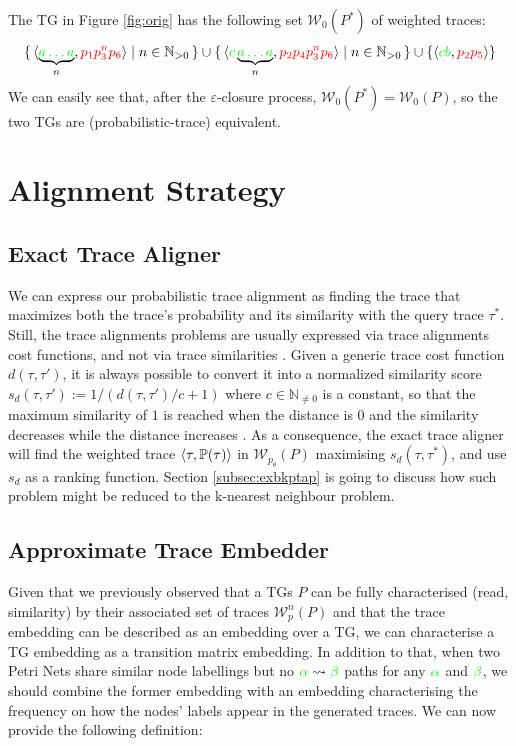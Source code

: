 \begin{example}
	The TG in Figure \ref{fig:orig} has the following set $\mathcal{W}_0(P^*)$ of weighted traces:
$$\set{\braket{\underbrace{\color{green}a\dots a}_{n},{\color{red}p_1p_3^np_6}}|n\in \mathbb{N}_{>0}}\cup \set{\braket{{\color{green}c}\underbrace{\color{green}a\dots a}_{n},{\color{red}p_2p_4p_3^np_6}}|n\in \mathbb{N}_{>0}}\cup\{\braket{{\color{green}cb},{\color{red}p_2p_5}}\}$$
We can easily see that, after the $\varepsilon$-closure process, $\mathcal{W}_0(P^*)=\mathcal{W}_0(P)$, so the two TGs are (probabilistic-trace) equivalent.
\end{example}

\section{Alignment Strategy}

\subsection{Exact Trace Aligner}\label{subsec:eta}
We can express our probabilistic trace alignment as finding the trace that maximizes both the trace's probability and its similarity with the query trace $\tau^*$. Still, the trace alignments problems are usually expressed via trace alignments cost functions, and not via trace similarities \cite{LeoniM17}. Given a generic trace cost function $d(\tau,\tau')$, it is always possible to convert it into a normalized similarity score $s_d(\tau,\tau'):=1/(d(\tau,\tau')/c+1)$ where $c\in\mathbb{N}_{\neq 0}$ is a constant, so that the maximum similarity of $1$ is reached when the distance is $0$ and the similarity decreases while the distance increases \cite{BergamiBM20}. As a consequence, the exact trace aligner will find the weighted trace $\braket{\tau,\mathbb{P}(\tau)}$ in $\mathcal{W}_{p_\theta}(P)$ maximising $s_d(\tau,\tau^*)$, and use $s_d$ as a ranking function. Section \ref{subsec:exbkptap} is going to discuss how such problem might be reduced to the k-nearest neighbour problem.

\subsection{Approximate Trace Embedder}\label{subsec:ate}
Given that we previously observed that a TGs $P$ can be fully characterised (read, similarity) by their associated set of traces $\mathcal{W}_p^n(P)$  and that the trace embedding can be described as an embedding over a TG, we can characterise a TG embedding as a transition matrix embedding. In addition to that, when two Petri Nets share similar node labellings but no ${\color{green}\alpha}\rightsquigarrow{\color{green}\beta}$ paths for any ${\color{green}\alpha}$ and ${\color{green}\beta}$, we should combine the former embedding with an embedding characterising the frequency on how the nodes' labels appear in the generated traces. We can now provide the following definition:


